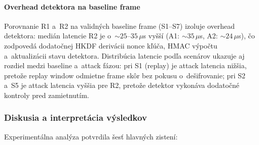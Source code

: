 \paragraph{Overhead detektora na baseline frame}

Porovnanie R1 a~R2 na validných baseline frame (S1--S7) izoluje overhead detektora: medián latencie R2 je o~${\sim}25$--$35\,\mu$s vyšší (A1: ${\sim}35\,\mu$s, A2: ${\sim}24\,\mu$s), čo zodpovedá dodatočnej HKDF derivácii nonce kľúča, HMAC výpočtu a~aktualizácii stavu detektora. Distribúcia latencie podľa scenárov ukazuje aj rozdiel medzi baseline a~attack fázou: pri S1 (replay) je attack latencia nižšia, pretože replay window odmietne frame skôr bez pokusu o~dešifrovanie; pri S2 a~S5 je attack latencia vyššia pre R2, pretože detektor vykonáva dodatočné kontroly pred zamietnutím.

\subsubsection{Diskusia a interpretácia výsledkov}
\label{sec:discussion}

Experimentálna analýza potvrdila šesť hlavných zistení:

